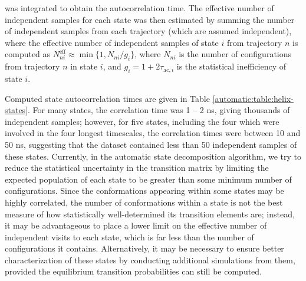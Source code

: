 was
integrated to obtain the autocorrelation time.
The effective number of independent samples for each state was then estimated by summing the number of independent samples from each trajectory (which are assumed independent), where the effective number of independent samples of state $i$ from trajectory $n$ is computed as  $N^\mathrm{eff}_{ni} \approx \min\{ 1, N_{ni} / g_i \}$, where $N_{ni}$ is the number of configurations from trajectory $n$ in state $i$, and $g_i = 1 + 2 \tau_{\mathrm{ac},i}$ is the statistical inefficiency of state $i$.

Computed state autocorrelation times are given in Table \ref{automatic:table:helix-states}.
For many states, the correlation time was 1 -- 2 ns, giving thousands of independent samples; however, for five states, including the four which were involved in the four longest timescales, the correlation times were between 10 and 50 ns, suggesting that the dataset contained less than 
50
independent samples of these states.
Currently, in the automatic state decomposition algorithm, we try to reduce the statistical uncertainty in the transition matrix by limiting the expected population of each state to be greater than some minimum number of configurations.
Since the conformations appearing within some states may be highly correlated, the number of conformations within a state is not the best measure of how statistically well-determined its transition elements are; instead, it may be advantageous to place a lower limit on the effective number of independent visits to each state, which is far less than the number of configurations it contains.
Alternatively, it may be necessary to ensure better characterization of these states by conducting additional simulations from them, provided the equilibrium transition probabilities can still be computed.

